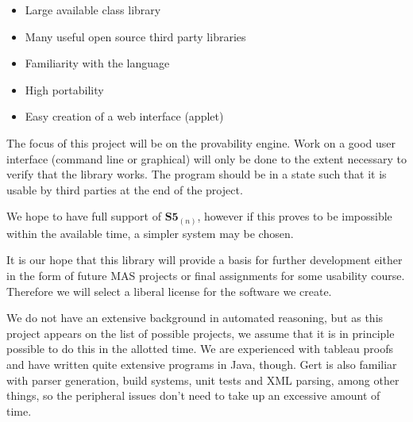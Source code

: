 \documentclass[11pt,a4paper]{article}
\begin{document}
\begin{itemize}
\item Large available class library 
\item Many useful open source third party libraries 
\item Familiarity with the language
\item High portability
\item Easy creation of a web interface (applet)
\end{itemize}

The focus of this project will be on the provability engine. Work on a good
user interface (command line or graphical) will only be done to the extent
necessary to verify that the library works. The program should be in a state
such that it is usable by third parties at the end of the project.

We hope to have full support of $\textbf{S5}_{(n)}$, however if this proves to
be impossible within the available time, a simpler system may be chosen.

It is our hope that this library will provide a basis for further development
either in the form of future MAS projects or final assignments for  some
usability course. Therefore we will select a liberal license for the software
we create.

We do not have an extensive background in automated reasoning, but as this
project appears on the list of possible projects, we assume that it is in
principle possible to do this in the allotted time. We are experienced with
tableau proofs and have written quite extensive programs in Java, though. Gert
is also familiar with parser generation, build systems, unit tests and XML
parsing, among other things, so the peripheral issues don't need to take up an
excessive amount of time.
\end{document}
